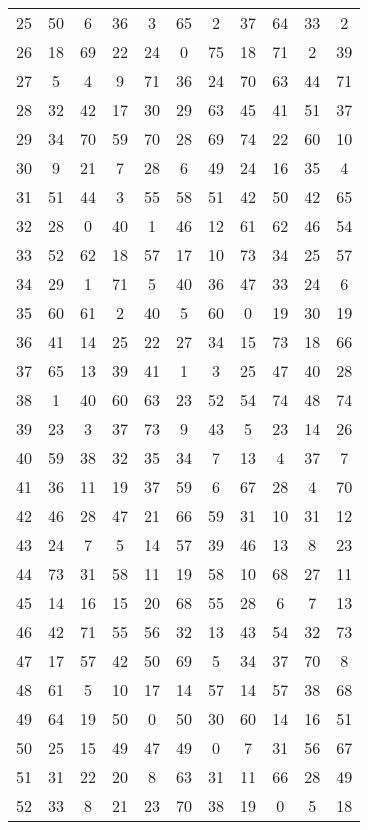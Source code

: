 \begin{table}
\begin{tabular}{c c c c c c c c c c c }
25 & 50 & 6 & 36 & 3 & 65 & 2 & 37 & 64 & 33 & 2 \\
26 & 18 & 69 & 22 & 24 & 0 & 75 & 18 & 71 & 2 & 39 \\
27 & 5 & 4 & 9 & 71 & 36 & 24 & 70 & 63 & 44 & 71 \\
28 & 32 & 42 & 17 & 30 & 29 & 63 & 45 & 41 & 51 & 37 \\
29 & 34 & 70 & 59 & 70 & 28 & 69 & 74 & 22 & 60 & 10 \\
30 & 9 & 21 & 7 & 28 & 6 & 49 & 24 & 16 & 35 & 4 \\
31 & 51 & 44 & 3 & 55 & 58 & 51 & 42 & 50 & 42 & 65 \\
32 & 28 & 0 & 40 & 1 & 46 & 12 & 61 & 62 & 46 & 54 \\
33 & 52 & 62 & 18 & 57 & 17 & 10 & 73 & 34 & 25 & 57 \\
34 & 29 & 1 & 71 & 5 & 40 & 36 & 47 & 33 & 24 & 6 \\
35 & 60 & 61 & 2 & 40 & 5 & 60 & 0 & 19 & 30 & 19 \\
36 & 41 & 14 & 25 & 22 & 27 & 34 & 15 & 73 & 18 & 66 \\
37 & 65 & 13 & 39 & 41 & 1 & 3 & 25 & 47 & 40 & 28 \\
38 & 1 & 40 & 60 & 63 & 23 & 52 & 54 & 74 & 48 & 74 \\
39 & 23 & 3 & 37 & 73 & 9 & 43 & 5 & 23 & 14 & 26 \\
40 & 59 & 38 & 32 & 35 & 34 & 7 & 13 & 4 & 37 & 7 \\
41 & 36 & 11 & 19 & 37 & 59 & 6 & 67 & 28 & 4 & 70 \\
42 & 46 & 28 & 47 & 21 & 66 & 59 & 31 & 10 & 31 & 12 \\
43 & 24 & 7 & 5 & 14 & 57 & 39 & 46 & 13 & 8 & 23 \\
44 & 73 & 31 & 58 & 11 & 19 & 58 & 10 & 68 & 27 & 11 \\
45 & 14 & 16 & 15 & 20 & 68 & 55 & 28 & 6 & 7 & 13 \\
46 & 42 & 71 & 55 & 56 & 32 & 13 & 43 & 54 & 32 & 73 \\
47 & 17 & 57 & 42 & 50 & 69 & 5 & 34 & 37 & 70 & 8 \\
48 & 61 & 5 & 10 & 17 & 14 & 57 & 14 & 57 & 38 & 68 \\
49 & 64 & 19 & 50 & 0 & 50 & 30 & 60 & 14 & 16 & 51 \\
50 & 25 & 15 & 49 & 47 & 49 & 0 & 7 & 31 & 56 & 67 \\
51 & 31 & 22 & 20 & 8 & 63 & 31 & 11 & 66 & 28 & 49 \\
52 & 33 & 8 & 21 & 23 & 70 & 38 & 19 & 0 & 5 & 18 \\

\end{tabular}
\end{table}
